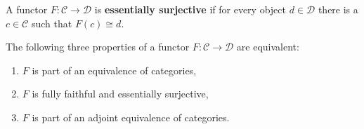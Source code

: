 \begin{definition}
  A functor $ F: \mathcal{C} \to \mathcal{D} $ is \textbf{essentially surjective} if for every object $ d \in \mathcal{D} $ there is a $ c \in \mathcal{C} $ such that $ F(c) \cong d $.
\end{definition}

\begin{theorem}
  The following three properties of a functor $ F: \mathcal{C} \to \mathcal{D} $ are equivalent:
  \begin{enumerate}
    \item $ F $ is part of an equivalence of categories,
    \item $ F $ is fully faithful and essentially surjective,
    \item $ F $ is part of an adjoint equivalence of categories.
  \end{enumerate}
\end{theorem}
